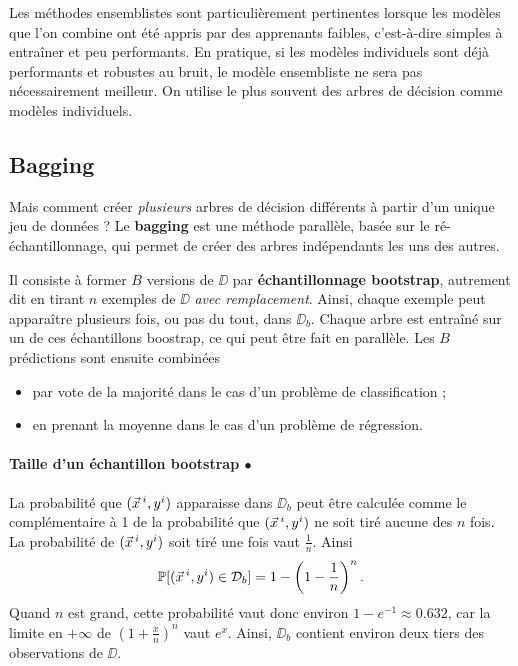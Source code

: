 Les méthodes ensemblistes sont particulièrement pertinentes lorsque les modèles
que l'on combine ont été appris par des apprenants faibles, c'est-à-dire
simples à entraîner et peu performants.  En pratique, si les modèles
individuels sont déjà performants et robustes au bruit, le modèle ensembliste
ne sera pas nécessairement meilleur. On utilise le plus souvent des arbres de
décision comme modèles individuels.

\subsection{Bagging} Mais comment créer {\it plusieurs} arbres de décision
différents à partir d'un unique jeu de données ? Le \textbf{bagging} est une
méthode parallèle, basée sur le ré-échantillonnage, qui permet de créer des
arbres indépendants les uns des autres.

Il consiste à former $B$ versions de $\DD$ par \textbf{échantillonnage
  bootstrap}, autrement dit en tirant $n$ exemples de $\DD$ {\it avec
  remplacement}. Ainsi, chaque exemple peut apparaître plusieurs fois, ou pas
du tout, dans $\DD_b$. Chaque arbre est entraîné sur un de ces échantillons
boostrap, ce qui peut être fait en parallèle. Les $B$ prédictions sont ensuite
combinées
\begin{itemize}
\item par vote de la majorité dans le cas d'un problème de classification ; 
\item en prenant la moyenne dans le cas d'un problème de régression.
\end{itemize}

\paragraph{Taille d'un échantillon bootstrap $\bullet$}
La probabilité que $(\xx^i, y^i)$ apparaisse dans $\DD_b$ peut être calculée
comme le complémentaire à 1 de la probabilité que $(\xx^i, y^i)$ ne soit tiré
aucune des $n$ fois. La probabilité de $(\xx^i, y^i)$ soit tiré une fois vaut
$\frac1n$. Ainsi
\begin{equation*}
  \PP[(\xx^i, y^i) \in \DD_b] = 1 - \left(1 - \frac1n\right)^n.
\end{equation*}
Quand $n$ est grand, cette probabilité vaut donc environ
$1 - e^{-1} \approx 0.632$, car la limite en $+\infty$ de
$\left(1 + \frac{x}{n}\right)^n$ vaut $e^x$.  Ainsi, $\DD_b$ contient environ
deux tiers des observations de $\DD$.



